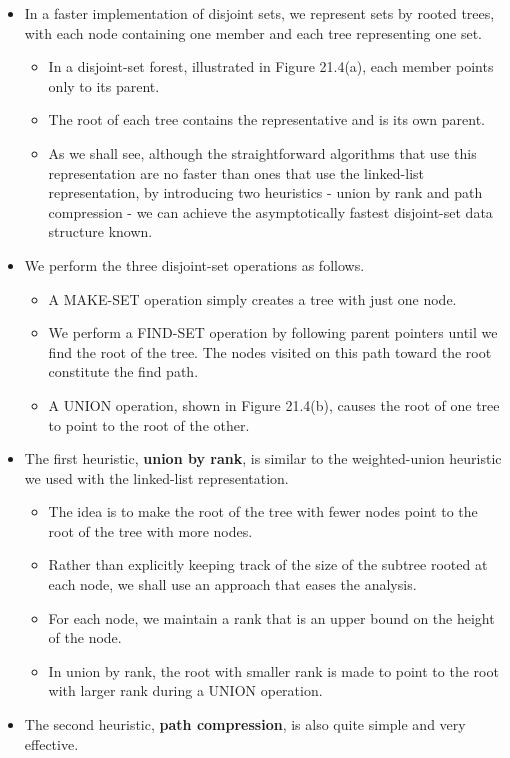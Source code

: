 \documentclass[a4paper,11pt]{article}
\begin{document}
\begin{itemize}
\itemsep1pt\parskip0pt
\item
  In a faster implementation of disjoint sets, we represent sets by
  rooted trees, with each node containing one member and each tree
  representing one set.

  \begin{itemize}
  \itemsep1pt\parskip0pt
  \item
    In a disjoint-set forest, illustrated in Figure 21.4(a), each member
    points only to its parent.
  \item
    The root of each tree contains the representative and is its own
    parent.
  \item
    As we shall see, although the straightforward algorithms that use
    this representation are no faster than ones that use the linked-list
    representation, by introducing two heuristics - union by rank and
    path compression - we can achieve the asymptotically fastest
    disjoint-set data structure known.
  \end{itemize}
\item
  We perform the three disjoint-set operations as follows.

  \begin{itemize}
  \itemsep1pt\parskip0pt
  \item
    A MAKE-SET operation simply creates a tree with just one node.
  \item
    We perform a FIND-SET operation by following parent pointers until
    we find the root of the tree. The nodes visited on this path toward
    the root constitute the find path.
  \item
    A UNION operation, shown in Figure 21.4(b), causes the root of one
    tree to point to the root of the other.
  \end{itemize}
\item
  The first heuristic, \textbf{union by rank}, is similar to the
  weighted-union heuristic we used with the linked-list representation.

  \begin{itemize}
  \itemsep1pt\parskip0pt
  \item
    The idea is to make the root of the tree with fewer nodes point to
    the root of the tree with more nodes.
  \item
    Rather than explicitly keeping track of the size of the subtree
    rooted at each node, we shall use an approach that eases the
    analysis.
  \item
    For each node, we maintain a rank that is an upper bound on the
    height of the node.
  \item
    In union by rank, the root with smaller rank is made to point to the
    root with larger rank during a UNION operation.
  \end{itemize}
\item
  The second heuristic, \textbf{path compression}, is also quite simple
  and very effective.


\end{itemize}
\end{document}
